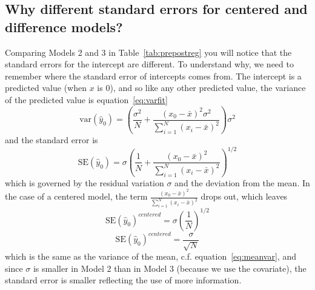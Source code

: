 \subsection{Why different standard errors for centered and difference models?}

Comparing Models 2 and 3 in Table~\ref{tab:prepostreg} you will notice that the standard errors for the intercept are different. To understand why, we need to remember where the standard error of intercepts comes from. The intercept is a predicted value (when $x$ is 0), and so like any other predicted value, the variance of the predicted value is equation~\eqref{eq:varfit}
\[
\mbox{var}\left(\hat{y}_0\right)=\left(\frac{\sigma^2}{N}+\frac{\left(x_0-\bar{x}\right)^2\sigma^2}{\sum_{i=1}^N\left(x_i-\bar{x}\right)^2}\right)\sigma^2
\]
and the standard error is
\begin{equation}
\mbox{SE}\left(\hat{y}_0\right)=\sigma\left(\frac{1}{N}+\frac{\left(x_0-\bar{x}\right)^2}{\sum_{i=1}^N\left(x_i-\bar{x}\right)^2}\right)^{1/2}
\end{equation}
which is governed by the residual variation $\sigma$ and the deviation from the mean. In the case of a centered model, the term $\frac{\left(x_0-\bar{x}\right)^2}{\sum_{i=1}^N\left(x_i-\bar{x}\right)^2}$ drops out, which leaves
\begin{equation}
\mbox{SE}\left(\hat{y}_0\right)^{centered}=\sigma\left(\frac{1}{N}\right)^{1/2}
\end{equation}
\begin{equation}
\mbox{SE}\left(\hat{y}_0\right)^{centered}=\frac{\sigma}{\sqrt{N}}
\end{equation}
which is the same as the variance of the mean, c.f. equation~\eqref{eq:meanvar}, and since $\sigma$ is smaller in Model 2 than in Model 3 (because we use the covariate), the standard error is smaller reflecting the use of more information.

